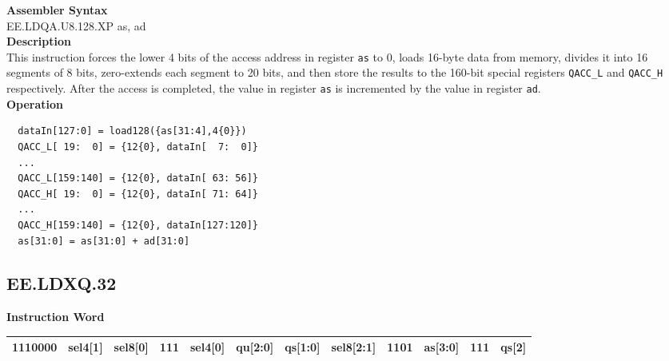 \textbf{Assembler Syntax} \\
EE.LDQA.U8.128.XP as, ad \\
\textbf{Description} \\
This instruction forces the lower 4 bits of the access address in register \lstinline{as} to 0, loads 16-byte data from memory, divides it into 16 segments of 8 bits, zero-extends each segment to 20 bits, and then store the results to the 160-bit special registers \lstinline{QACC_L} and \lstinline{QACC_H} respectively. After the access is completed, the value in register \lstinline{as} is incremented by the value in register \lstinline{ad}.\\
\textbf{Operation}
\begin{lstlisting}
  dataIn[127:0] = load128({as[31:4],4{0}})
  QACC_L[ 19:  0] = {12{0}, dataIn[  7:  0]}
  ...
  QACC_L[159:140] = {12{0}, dataIn[ 63: 56]}
  QACC_H[ 19:  0] = {12{0}, dataIn[ 71: 64]}
  ...
  QACC_H[159:140] = {12{0}, dataIn[127:120]}
  as[31:0] = as[31:0] + ad[31:0]
\end{lstlisting}

\clearpage
\subsection{EE.LDXQ.32}\label{instruction:EELDXQ32}
\setlength\tabcolsep{6pt}
\textbf{Instruction Word} \\
\begin{tabular}{|c|c|c|c|c|c|c|c|c|c|c|c|}
	\hline
	1110000 & sel4[1] & sel8[0] & 111 & sel4[0] & qu[2:0] & qs[1:0] & sel8[2:1] & 1101 & as[3:0] & 111 & qs[2] \\
	\hline
\end{tabular}

